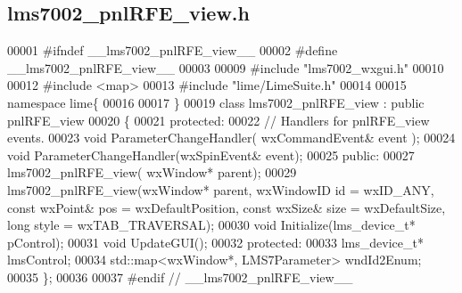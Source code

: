 \subsection{lms7002\+\_\+pnl\+R\+F\+E\+\_\+view.\+h}
\label{lms7002__pnlRFE__view_8h_source}

\begin{DoxyCode}
00001 \textcolor{preprocessor}{#ifndef \_\_lms7002\_pnlRFE\_view\_\_}
00002 \textcolor{preprocessor}{#define \_\_lms7002\_pnlRFE\_view\_\_}
00003 
00009 \textcolor{preprocessor}{#include "lms7002_wxgui.h"}
00010 
00012 \textcolor{preprocessor}{#include <map>}
00013 \textcolor{preprocessor}{#include "lime/LimeSuite.h"}
00014 
00015 \textcolor{keyword}{namespace }lime\{
00016 
00017 \}
00019 \textcolor{keyword}{class }lms7002_pnlRFE_view : \textcolor{keyword}{public} pnlRFE_view
00020 \{
00021     \textcolor{keyword}{protected}:
00022         \textcolor{comment}{// Handlers for pnlRFE\_view events.}
00023         \textcolor{keywordtype}{void} ParameterChangeHandler( wxCommandEvent& event );
00024         \textcolor{keywordtype}{void} ParameterChangeHandler(wxSpinEvent& event);
00025     \textcolor{keyword}{public}:
00027         lms7002_pnlRFE_view( wxWindow* parent);
00029         lms7002_pnlRFE_view(wxWindow* parent, wxWindowID \textcolor{keywordtype}{id} = wxID\_ANY, \textcolor{keyword}{const} wxPoint& pos = 
      wxDefaultPosition, \textcolor{keyword}{const} wxSize& size = wxDefaultSize, \textcolor{keywordtype}{long} style = wxTAB\_TRAVERSAL);
00030     \textcolor{keywordtype}{void} Initialize(lms_device_t* pControl);
00031     \textcolor{keywordtype}{void} UpdateGUI();
00032 \textcolor{keyword}{protected}:
00033     lms_device_t* lmsControl;
00034     std::map<wxWindow*, LMS7Parameter> wndId2Enum;
00035 \};
00036 
00037 \textcolor{preprocessor}{#endif // \_\_lms7002\_pnlRFE\_view\_\_}
\end{DoxyCode}
